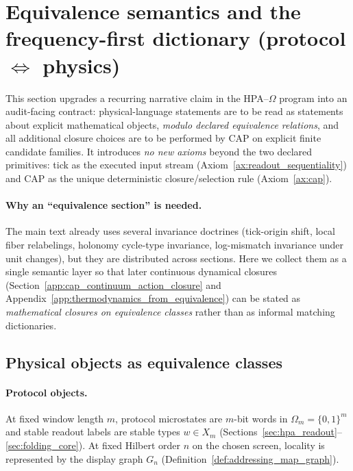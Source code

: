 \section{Equivalence semantics and the frequency-first dictionary (protocol \texorpdfstring{$\Leftrightarrow$}{<->} physics)}
\label{app:equivalence_semantics}

This section upgrades a recurring narrative claim in the HPA--$\Omega$ program into an audit-facing contract:
physical-language statements are to be read as statements about explicit mathematical objects, \emph{modulo declared equivalence relations}, and all additional closure choices are to be performed by CAP on explicit finite candidate families.
It introduces \emph{no new axioms} beyond the two declared primitives:
tick as the executed input stream (Axiom~\ref{ax:readout_sequentiality}) and CAP as the unique deterministic closure/selection rule (Axiom~\ref{ax:cap}).

\paragraph{Why an ``equivalence section'' is needed.}
The main text already uses several invariance doctrines (tick-origin shift, local fiber relabelings, holonomy cycle-type invariance, log-mismatch invariance under unit changes), but they are distributed across sections.
Here we collect them as a single semantic layer so that later continuous dynamical closures (Section~\ref{app:cap_continuum_action_closure} and Appendix~\ref{app:thermodynamics_from_equivalence}) can be stated as \emph{mathematical closures on equivalence classes} rather than as informal matching dictionaries.

\subsection{Physical objects as equivalence classes}
\label{subsec:equivalence_physical_objects}

\paragraph{Protocol objects.}
\MathTag At fixed window length $m$, protocol microstates are $m$-bit words in $\Omega_m=\{0,1\}^m$ and stable readout labels are stable types $w\in X_m$ (Sections~\ref{sec:hpa_readout}--\ref{sec:folding_core}).
At fixed Hilbert order $n$ on the chosen screen, locality is represented by the display graph $G_n$ (Definition~\ref{def:addressing_map_graph}).

